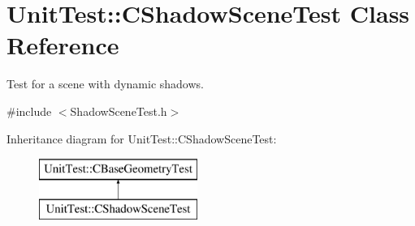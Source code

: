 \hypertarget{class_unit_test_1_1_c_shadow_scene_test}{}\section{Unit\+Test\+::C\+Shadow\+Scene\+Test Class Reference}
\label{class_unit_test_1_1_c_shadow_scene_test}


Test for a scene with dynamic shadows.  




{\ttfamily \#include $<$Shadow\+Scene\+Test.\+h$>$}

Inheritance diagram for Unit\+Test\+::C\+Shadow\+Scene\+Test\+:\begin{figure}[H]
\begin{center}
\leavevmode
\includegraphics[height=2.000000cm]{class_unit_test_1_1_c_shadow_scene_test}
\end{center}
\end{figure}
